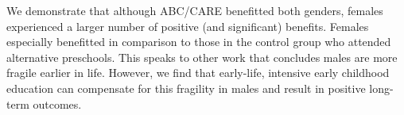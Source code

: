 We demonstrate that although ABC/CARE benefitted both genders, females experienced a larger number of positive (and significant) benefits. Females especially benefitted in comparison to those in the control group who attended alternative preschools. This speaks to other work that concludes males are more fragile earlier in life. However, we find that early-life, intensive early childhood education can compensate for this fragility in males and result in positive long-term outcomes.